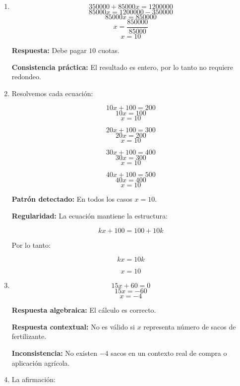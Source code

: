 \documentclass[11pt]{article}
\begin{document}
\begin{enumerate}[label=\textbf{\arabic*.}]
	Si \(P=3200\) y \(a=45\):
	
	\[
	x=\frac{3200-500}{45}
	\]
	\[
	x=\frac{2700}{45}
	\]
	\[
	x=60
	\]
	
	\textbf{Respuesta:} Se cultivan \(60\) hectáreas.
	
	\newpage
	\vspace*{0.2cm}
	\item 
	\[
	350000+85000x=1200000
	\]
	\[
	85000x=1200000-350000
	\]
	\[
	85000x=850000
	\]
	\[
	x=\frac{850000}{85000}
	\]
	\[
	x=10
	\]
	
	\textbf{Respuesta:} Debe pagar \(10\) cuotas.
	
	\textbf{Consistencia práctica:} El resultado es entero, por lo tanto no requiere redondeo.
	
	\item 
	Resolvemos cada ecuación:
	
	\[
	10x+100=200
	\]
	\[
	10x=100
	\]
	\[
	x=10
	\]
	
	\[
	20x+100=300
	\]
	\[
	20x=200
	\]
	\[
	x=10
	\]
	
	\[
	30x+100=400
	\]
	\[
	30x=300
	\]
	\[
	x=10
	\]
	
	\[
	40x+100=500
	\]
	\[
	40x=400
	\]
	\[
	x=10
	\]
	
	\textbf{Patrón detectado:} En todos los casos \(x=10\).
	
	\textbf{Regularidad:} La ecuación mantiene la estructura:
	
	\[
	kx+100=100+10k
	\]
	
	Por lo tanto:
	
	\[
	kx=10k
	\]
	
	\[
	x=10
	\]
	
	\newpage
	\vspace*{0.2cm}
	\item 
	\[
	15x+60=0
	\]
	\[
	15x=-60
	\]
	\[
	x=-4
	\]
	
	\textbf{Respuesta algebraica:} El cálculo es correcto.
	
	\textbf{Respuesta contextual:} No es válido si \(x\) representa número de sacos de fertilizante.
	
	\textbf{Inconsistencia:} No existen \(-4\) sacos en un contexto real de compra o aplicación agrícola.
	
	\item 
	La afirmación:
	

\end{enumerate}
\end{document}
